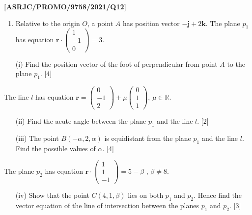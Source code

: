 \item \textbf{{[}ASRJC/PROMO/9758/2021/Q12{]}}
\begin{enumerate}
\item Relative to the origin $O$, a point $A$ has position vector $-\mathbf{j}+2\mathbf{k}$.
The plane $p_{1}$ has equation $\mathbf{r}\cdot\left(\begin{array}{c}
1\\
-1\\
0
\end{array}\right)=3$. 
\item[(i)]  Find the position vector of the foot of perpendicular from point
$A$ to the plane $p_{1}$.\hfill{} {[}4{]}
\end{enumerate}
The line $l$ has equation $\mathbf{r}=\left(\begin{array}{c}
0\\
-1\\
2
\end{array}\right)+\mu\left(\begin{array}{c}
0\\
1\\
1
\end{array}\right)$, $\mu\in\mathbb{R}$.
\begin{enumerate}
\item[(ii)]  Find the acute angle between the plane $p_{1}$ and the line $l$.
\hfill{}{[}2{]}
\item[(iii)]  The point $B\left(-\alpha,2,\alpha\right)$ is equidistant from
the plane $p_{1}$ and the line $l$. Find the possible values of
$\alpha$. {[}4{]}
\end{enumerate}
The plane $p_{2}$ has equation $\mathbf{r}\cdot\left(\begin{array}{c}
1\\
1\\
-1
\end{array}\right)=5-\beta$ , $\beta\ne8$. 
\begin{enumerate}
\item[(iv)]  Show that the point $C\left(4,1,\beta\right)$ lies on both $p_{1}$
and $p_{2}$. Hence find the vector equation of the line of intersection
between the planes $p_{1}$ and $p_{2}$.\hfill{} {[}3{]}
\end{enumerate}